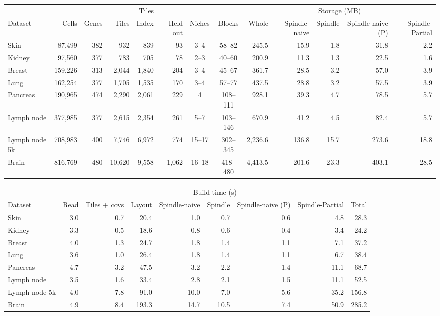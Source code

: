 \begin{tabular}{lrrrrrccrrrrr}
\toprule
 &  &  & \multicolumn{3}{c}{Tiles} &  &  & \multicolumn{5}{c}{Storage (MB)} \\
\cmidrule(lr){4-6} \cmidrule(lr){9-13}
Dataset & Cells & Genes & Tiles & Index & Held out & Niches & Blocks & Whole & Spindle-naive & Spindle & Spindle-naive (P) & Spindle-Partial \\
\midrule
Skin & 87{,}499 & 382 & 932 & 839 & 93 & 3--4 & 58--82 & 245.5 & 15.9 & 1.8 & 31.8 & 2.2 \\
Kidney & 97{,}560 & 377 & 783 & 705 & 78 & 2--3 & 40--60 & 200.9 & 11.3 & 1.3 & 22.5 & 1.6 \\
Breast & 159{,}226 & 313 & 2{,}044 & 1{,}840 & 204 & 3--4 & 45--67 & 361.7 & 28.5 & 3.2 & 57.0 & 3.9 \\
Lung & 162{,}254 & 377 & 1{,}705 & 1{,}535 & 170 & 3--4 & 57--77 & 437.5 & 28.8 & 3.2 & 57.5 & 3.9 \\
Pancreas & 190{,}965 & 474 & 2{,}290 & 2{,}061 & 229 & 4 & 108--111 & 928.1 & 39.3 & 4.7 & 78.5 & 5.7 \\
Lymph node & 377{,}985 & 377 & 2{,}615 & 2{,}354 & 261 & 5--7 & 103--146 & 670.9 & 41.2 & 4.5 & 82.4 & 5.7 \\
Lymph node 5k & 708{,}983 & 400 & 7{,}746 & 6{,}972 & 774 & 15--17 & 302--345 & 2{,}236.6 & 136.8 & 15.7 & 273.6 & 18.8 \\
Brain & 816{,}769 & 480 & 10{,}620 & 9{,}558 & 1{,}062 & 16--18 & 418--480 & 4{,}413.5 & 201.6 & 23.3 & 403.1 & 28.5 \\
\bottomrule
\end{tabular}

\medskip

\begin{tabular}{lrrrrrrrr}
\toprule
 & \multicolumn{8}{c}{Build time (s)} \\
\cmidrule(lr){2-9}
Dataset & Read & Tiles + covs & Layout & Spindle-naive & Spindle & Spindle-naive (P) & Spindle-Partial & Total \\
\midrule
Skin & 3.0 & 0.7 & 20.4 & 1.0 & 0.7 & 0.6 & 4.8 & 28.3 \\
Kidney & 3.3 & 0.5 & 18.6 & 0.8 & 0.6 & 0.4 & 3.4 & 24.2 \\
Breast & 4.0 & 1.3 & 24.7 & 1.8 & 1.4 & 1.1 & 7.1 & 37.2 \\
Lung & 3.6 & 1.0 & 26.4 & 1.8 & 1.4 & 1.1 & 6.7 & 38.4 \\
Pancreas & 4.7 & 3.2 & 47.5 & 3.2 & 2.2 & 1.4 & 11.1 & 68.7 \\
Lymph node & 3.5 & 1.6 & 33.4 & 2.8 & 2.1 & 1.5 & 11.1 & 52.5 \\
Lymph node 5k & 4.0 & 7.8 & 91.0 & 10.0 & 7.0 & 5.6 & 35.2 & 156.8 \\
Brain & 4.9 & 8.4 & 193.3 & 14.7 & 10.5 & 7.4 & 50.9 & 285.2 \\
\bottomrule
\end{tabular}
